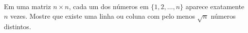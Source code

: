 \documentclass[10pt, a4paper]{article}
\begin{document}
	\begin{prob}
		Em uma matriz $n \times n$, cada um dos números em $\{1, 2, \dots , n\}$ aparece exatamente $n$ vezes. Mostre que existe uma linha ou coluna com pelo menos $\sqrt{n}$ números distintos.
	\end{prob}


\end{document}
